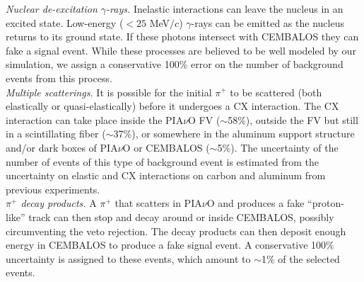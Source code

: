 { \it Nuclear de-excitation $\gamma$-rays.} Inelastic interactions can leave the nucleus in an excited state. Low-energy ($<25$ MeV$/c$) $\gamma$-rays can be emitted as the nucleus returns to its ground state. If these photons intersect with CEMBALOS they can fake a signal event. While these processes are believed to be well modeled by our simulation, we assign a conservative 100\% error on the number of background events from this process.\\

{ \it Multiple scatterings.} It is possible for the initial $\pi^{+}$ to be scattered (both elastically or quasi-elastically) before it undergoes a CX interaction. The CX interaction can take place inside the PIA$\nu$O FV ($\sim$58\%), outside the FV but still in a scintillating fiber ($\sim$37\%), or somewhere in the aluminum support structure and/or dark boxes of PIA$\nu$O or CEMBALOS ($\sim$5\%). The uncertainty of the number of events of this type of background event is estimated from the uncertainty on elastic and CX interactions on carbon and aluminum from previous experiments.\\

{ \it $\pi^{+}$ decay products.} A $\pi^{+}$ that scatters in PIA$\nu$O and produces a fake ``proton-like'' track can then stop and decay around or inside CEMBALOS, possibly circumventing the veto rejection. The decay products can then deposit enough energy in CEMBALOS to produce a fake signal event. A conservative 100\% uncertainty is assigned to these events, which amount to $\sim$1\% of the selected events. %


